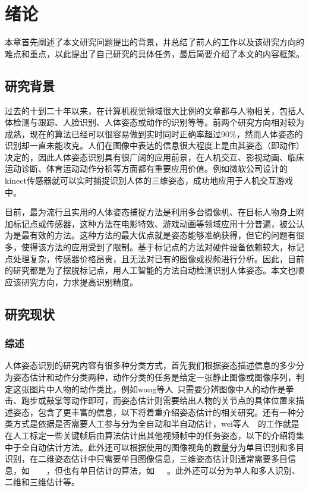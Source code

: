 


\chapter{绪论}
本章首先阐述了本文研究问题提出的背景，并总结了前人的工作以及该研究方向的难点和重点，以此提出了自己研究的具体任务，最后简要介绍了本文的内容框架。

\section{研究背景}
过去的十到二十年以来，在计算机视觉领域很大比例的文章都与人物相关，包括人体检测与跟踪、人脸识别、人体姿态或动作的识别等等。前两个研究方向相对较为成熟，现在的算法已经可以很容易做到实时同时正确率超过90\%，然而人体姿态的识别却一直未能攻克。人们在图像中表达的信息很大程度上是由其姿态（即动作）决定的，因此人体姿态识别具有很广阔的应用前景，在人机交互、影视动画、临床运动诊断、体育运动动作分析等方面都有重要应用价值。例如微软公司设计的kinect传感器就可以实时捕捉识别人体的三维姿态，成功地应用于人机交互游戏中。

目前，最为流行且实用的人体姿态捕捉方法是利用多台摄像机、在目标人物身上附加标记点或传感器，这种方法在电影特效、游戏动画等领域应用十分普遍，被公认为是最有效的方法。这种方法的最大优点就是姿态能够准确获得，但它的问题有很多，使得该方法的应用受到了限制。基于标记点的方法对硬件设备依赖较大，标记点处理复杂，传感器价格昂贵，且无法对已有的图像或视频进行分析。因此，目前的研究都是为了摆脱标记点，用人工智能的方法自动检测识别人体姿态。本文也顺应该研究方向，力求提高识别精度。

\section{研究现状}
\subsection{综述}
人体姿态识别的研究内容有很多种分类方式，首先我们根据姿态描述信息的多少分为姿态估计和动作分类两种，动作分类的任务是给定一张静止图像或图像序列，判定这张图片中人物的动作类比，例如wang等人~\cite{wang2007semi}只需要分辨图像中人的动作是拳击、跑步或鼓掌等动作即可，而姿态估计则需要给出人物的关节点的具体位置来描述姿态，包含了更丰富的信息，以下将着重介绍姿态估计的相关研究。还有一种分类方式是依据是否需要人工参与分为全自动和半自动估计，wei等人~\cite{wei2009modeling}~\cite{wei2010videomocap}的工作就是在人工标定一些关键帧后由算法估计出其他视频帧中的任务姿态，以下的介绍将集中于全自动估计方法。此外还可以根据使用的图像视角的数量分为单目识别和多目识别，在二维姿态估计中只需要单目图像信息，三维姿态估计则通常需要多目信息，如~\cite{bo2008fast}~\cite{burenius20133d}~\cite{bo2010twin}~\cite{Poppe2007}，但也有单目估计的算法，如~\cite{wei2009modeling}~\cite{wei2010videomocap}~\cite{agarwal2006recovering}。此外还可以分为单人和多人识别、二维和三维估计等。
